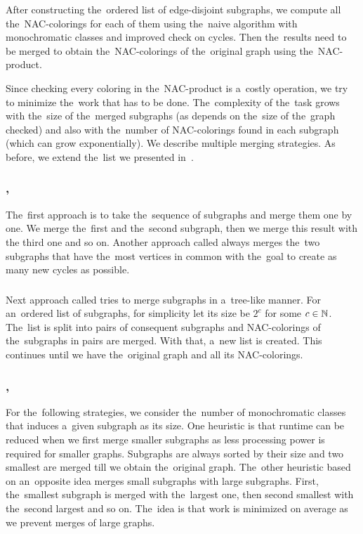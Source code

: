 After constructing the~ordered list of edge-disjoint subgraphs,
we compute all the~NAC-colorings for each of them using
the~naive algorithm with monochromatic classes
and improved check on cycles.
Then the~results need to be merged to obtain the~NAC-colorings of the~original graph
using the~NAC-product.

Since checking every coloring in the~NAC-product is a~costly operation,
we try to minimize the~work that has to be done.
The~complexity of the~task grows with the~size of
the~merged subgraphs (as \IsNACColoring{} depends on the~size of the~graph checked)
and also with the~number of NAC-colorings found in each subgraph
(which can grow exponentially).
We describe multiple merging strategies.
As before, we extend the~list we presented in~\cite{my_paper}.

\subsubsection*{\MergeLinear{}, \SharedVertices{}}

The~first approach \MergeLinear{} is
to take the~sequence of subgraphs and merge them one by one.
We merge the~first and the~second subgraph, then we merge this result with the
third one and so on.
%
Another approach called \SharedVertices{} always merges the~two subgraphs that
have the~most vertices in common with the~goal
to create as many new cycles as possible.

\subsubsection*{\Log{}}

Next approach called \Log{} tries to merge subgraphs in a~tree-like manner.
For an~ordered list of subgraphs,
for simplicity let its size be \( 2^c \) for some \( c \in \mathbb{N} \).
The~list is split into pairs of consequent subgraphs and NAC-colorings
of the~subgraphs in pairs are merged. With that, a~new list is created.
This continues until we have the~original graph and all its NAC-colorings.

\subsubsection*{\SortedBits{}, \MinMax{}}

For the~following strategies,
we consider the~number of monochromatic classes
that induces a~given subgraph as its size.
%
One heuristic \SortedBits{} is that runtime can be reduced
when we first merge smaller subgraphs as less processing power is
required for smaller graphs.
Subgraphs are always sorted by their size and two smallest are merged
till we obtain the~original graph.
%
The~other heuristic \MinMax{} based on an~opposite idea
merges small subgraphs with large subgraphs.
First, the~smallest subgraph is merged with the~largest one,
then second smallest with the~second largest and so on.
The~idea is that work is minimized on average
as we prevent merges of large graphs.

